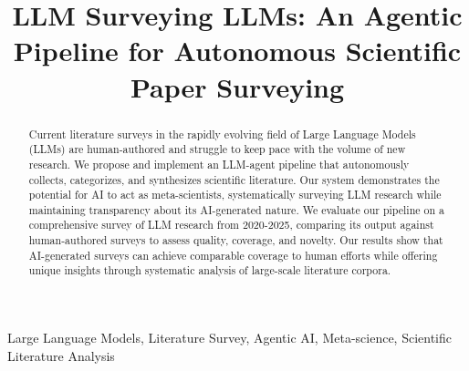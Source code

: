 \documentclass[conference]{IEEEtran}
\begin{document}
\title{LLM Surveying LLMs: An Agentic Pipeline for Autonomous Scientific Paper Surveying}

\author{
    \and
}

\maketitle

\begin{abstract}
Current literature surveys in the rapidly evolving field of Large Language Models (LLMs) are human-authored and struggle to keep pace with the volume of new research. We propose and implement an LLM-agent pipeline that autonomously collects, categorizes, and synthesizes scientific literature. Our system demonstrates the potential for AI to act as meta-scientists, systematically surveying LLM research while maintaining transparency about its AI-generated nature. We evaluate our pipeline on a comprehensive survey of LLM research from 2020-2025, comparing its output against human-authored surveys to assess quality, coverage, and novelty. Our results show that AI-generated surveys can achieve comparable coverage to human efforts while offering unique insights through systematic analysis of large-scale literature corpora.
\end{abstract}

\begin{IEEEkeywords}
Large Language Models, Literature Survey, Agentic AI, Meta-science, Scientific Literature Analysis
\end{IEEEkeywords}











\end{document}
